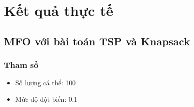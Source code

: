 \documentclass[a4paper,12pt]{report}
\begin{document}

\section{Kết quả thực tế}
\subsection{MFO với bài toán TSP và Knapsack}
\subsubsection{Tham số}

\begin{itemize}
\item Số lượng cá thể: 100
\item Mức độ đột biến: 0.1
\end{itemize}
\end{document}
